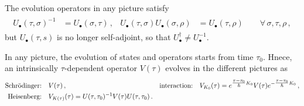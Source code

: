 \documentclass[../QFT_main.tex]{subfiles}
\begin{document}
\begin{mytheorem}
The evolution operators in any picture satisfy 
{\small\begin{align}\begin{aligned}
    U_\bullet(\tau,\sigma)^{-1}&=U_\bullet(\sigma,\tau)\,,
    &
    U_\bullet(\tau,\sigma)U_\bullet(\sigma,\rho)&=U_\bullet(\tau,\rho)
    \qquad\forall\,\sigma,\tau,\rho\,,
\end{aligned}\end{align}}
but $U_\bullet(\tau,s)$ is no longer self-adjoint, so that $U_\bullet^\dagger\neq U_\bullet^{-1}$.

In any picture, the evolution of states and operators starts from time $\tau_0$.
Hnece, an intrinsically $\tau$-dependent operator $V(\tau)$ evolves in the different pictures as
{\small\begin{align}\begin{aligned}
    \text{Schr\"odinger:}\quad&
    V(\tau)\,,
    &
    \text{interaction:}\quad&
    V_{K_0}(\tau)
    =
    e^{\tfrac{\tau-\tau_0}{\hbar}K_0}
    V(\tau)
    e^{-\tfrac{\tau-\tau_0}{\hbar}K_0}\,,
    \notag\\
    \text{Heisenberg:}\quad&
    V_{K(\tau)}(\tau)
    =
    U(\tau,\tau_0)^{-1}V(\tau)U(\tau,\tau_0)\,.
\end{aligned}\end{align}}
\end{mytheorem}
\end{document}
